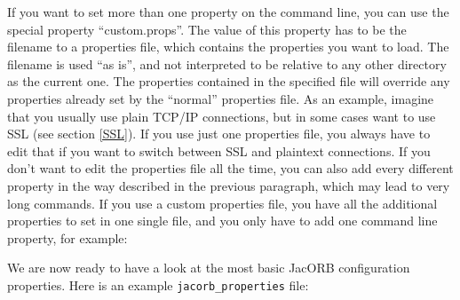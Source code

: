 \documentclass[12pt]{scrbook}
\begin{document}
If you want to set more than one property on the command line, you can use the
special property ``custom.props''. The value of this property has to be the
filename to a properties file, which contains the properties you want to load.
The filename is used ``as is'', and not interpreted to be relative to any
other directory as the current one. The properties contained in the specified
file will override any properties already set by the ``normal'' properties
file. As an example, imagine that you usually use plain TCP/IP connections,
but in some cases want to use SSL (see section \ref{SSL}). If you use just one
properties file, you always have to edit that if you want to switch between
SSL and plaintext connections. If you don't want to edit the properties file
all the time, you can also add every different property in the way described
in the previous paragraph, which may lead to very long commands. If you use a
custom properties file, you have all the additional properties to set in one
single file, and you only have to add one command line property, for example:


We are now ready to have a look at the most basic JacORB configuration
properties.  Here is an example {\tt jacorb\_properties} file:
\end{document}

